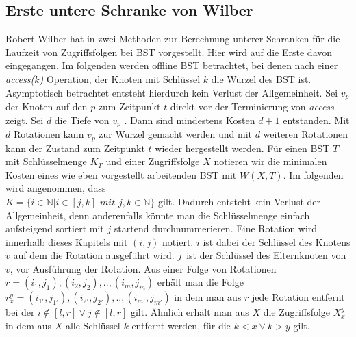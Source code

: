 \documentclass[a4paper,12pt]{article}
\begin{document}
\subsection{Erste untere Schranke von Wilber}
Robert Wilber hat in \cite{wilberLowerBounds} zwei Methoden zur Berechnung unterer Schranken für die Laufzeit von Zugriffsfolgen bei BST vorgestellt. Hier wird auf die Erste davon eingegangen. Im folgenden werden offline BST betrachtet, bei denen nach einer \textit{access($k$)} Operation, der Knoten mit Schlüssel $k$ die Wurzel des BST ist. Asymptotisch betrachtet entsteht hierdurch kein Verlust der Allgemeinheit. Sei $v_p$ der Knoten auf den $p$ zum Zeitpunkt $t$ direkt vor der Terminierung von \textit{access} zeigt. Sei $d$ die Tiefe von $v_p$ . Dann sind mindestens Kosten $d + 1$ entstanden. Mit $d$ Rotationen kann $v_p$ zur Wurzel gemacht werden und mit $d$ weiteren Rotationen kann der Zustand zum Zeitpunkt $t$ wieder hergestellt werden.
Für einen BST $T$ mit Schlüsselmenge $K_T$ und einer Zugriffsfolge $X$ notieren wir die minimalen Kosten eines wie eben vorgestellt arbeitenden BST mit $W(X, T)$. Im folgenden wird angenommen, dass \\
$K = \{  i \in \mathbb{N} \vert i \in \left[j,k\right] \textit{ mit } j,k \in  \mathbb{N} \} $ gilt. Dadurch entsteht kein Verlust der Allgemeinheit, denn anderenfalls könnte man die Schlüsselmenge einfach aufsteigend sortiert mit $j$ startend durchnummerieren. Eine Rotation wird innerhalb dieses Kapitels mit $\left(i, j\right)$ notiert. $i$ ist dabei der Schlüssel des Knotens $v$ auf dem die Rotation ausgeführt wird. $j$~ist der Schlüssel des Elternknoten von $v$, vor Ausführung der Rotation. Aus einer Folge von Rotationen $r = \left(i_1,j_1 \right),\left(i_2,j_2 \right),..,\left(i_m,j_m \right)$ erhält man die Folge  $r^y_x = \left(i_{1'},j_{1'}\right),\left(i_{2'},j_{2'} \right),..,\left(i_{m'},j_{m'} \right)$  in dem man aus $r$ jede Rotation entfernt bei der $i\notin \left[l,r\right] \lor j\notin \left[l,r\right]$ gilt. Ähnlich erhält man aus $X$ die Zugriffsfolge $X^y_x$ in dem aus $X$ alle Schlüssel $k$ entfernt werden, für die $k < x  \lor k > y$ gilt.
\end{document}
